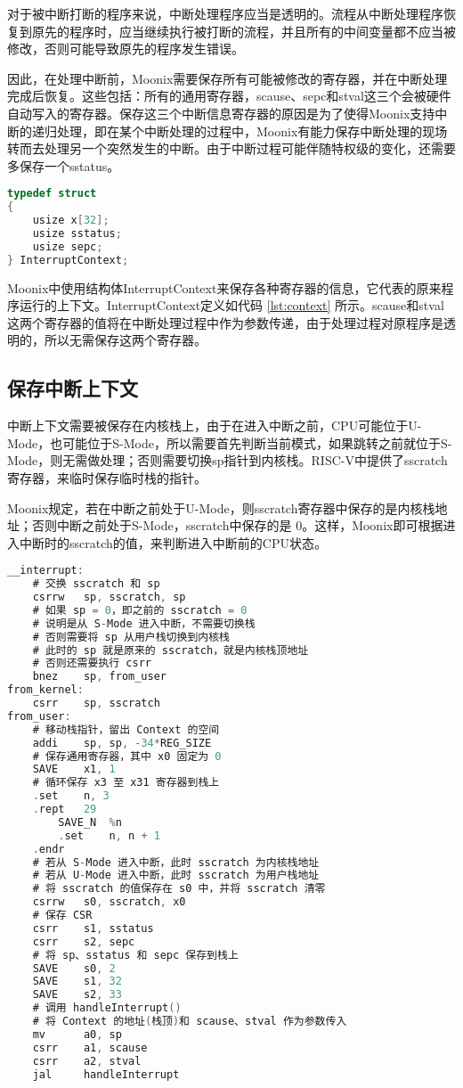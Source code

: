 对于被中断打断的程序来说，中断处理程序应当是透明的。流程从中断处理程序恢复到原先的程序时，应当继续执行被打断的流程，并且所有的中间变量都不应当被修改，否则可能导致原先的程序发生错误。

因此，在处理中断前，Moonix需要保存所有可能被修改的寄存器，并在中断处理完成后恢复。这些包括：所有的通用寄存器，scause、sepc和stval这三个会被硬件自动写入的寄存器。保存这三个中断信息寄存器的原因是为了使得Moonix支持中断的递归处理，即在某个中断处理的过程中，Moonix有能力保存中断处理的现场转而去处理另一个突然发生的中断。由于中断过程可能伴随特权级的变化，还需要多保存一个sstatus。

\begin{lstlisting}[language={C}, caption={上下文结构定义}, label={lst:context}]
typedef struct
{
	usize x[32];
	usize sstatus;
	usize sepc;
} InterruptContext;
\end{lstlisting}

Moonix中使用结构体InterruptContext来保存各种寄存器的信息，它代表的原来程序运行的上下文。InterruptContext定义如代码 \ref{lst:context} 所示。scause和stval这两个寄存器的值将在中断处理过程中作为参数传递，由于处理过程对原程序是透明的，所以无需保存这两个寄存器。

\subsection{保存中断上下文}

中断上下文需要被保存在内核栈上，由于在进入中断之前，CPU可能位于U-Mode，也可能位于S-Mode，所以需要首先判断当前模式，如果跳转之前就位于S-Mode，则无需做处理；否则需要切换sp指针到内核栈。RISC-V中提供了sscratch寄存器，来临时保存临时栈的指针。

Moonix规定，若在中断之前处于U-Mode，则sscratch寄存器中保存的是内核栈地址；否则中断之前处于S-Mode，sscratch中保存的是 0。这样，Moonix即可根据进入中断时的sscratch的值，来判断进入中断前的CPU状态。

\clearpage

\begin{lstlisting}[language={C}, caption={保存中断上下文}, label={lst:savecontext}]
__interrupt:
	# 交换 sscratch 和 sp
	csrrw   sp, sscratch, sp
	# 如果 sp = 0，即之前的 sscratch = 0
	# 说明是从 S-Mode 进入中断，不需要切换栈
	# 否则需要将 sp 从用户栈切换到内核栈
	# 此时的 sp 就是原来的 sscratch，就是内核栈顶地址
	# 否则还需要执行 csrr 
	bnez    sp, from_user
from_kernel:
	csrr    sp, sscratch
from_user:
	# 移动栈指针，留出 Context 的空间
	addi    sp, sp, -34*REG_SIZE
	# 保存通用寄存器，其中 x0 固定为 0
	SAVE    x1, 1
	# 循环保存 x3 至 x31 寄存器到栈上
	.set    n, 3
	.rept   29
		SAVE_N  %n
		.set    n, n + 1
	.endr
	# 若从 S-Mode 进入中断，此时 sscratch 为内核栈地址
	# 若从 U-Mode 进入中断，此时 sscratch 为用户栈地址
	# 将 sscratch 的值保存在 s0 中，并将 sscratch 清零
	csrrw   s0, sscratch, x0
	# 保存 CSR
	csrr    s1, sstatus
	csrr    s2, sepc
	# 将 sp、sstatus 和 sepc 保存到栈上 
	SAVE    s0, 2
	SAVE    s1, 32
	SAVE    s2, 33
	# 调用 handleInterrupt()
	# 将 Context 的地址(栈顶)和 scause、stval 作为参数传入
	mv      a0, sp
	csrr    a1, scause
	csrr    a2, stval
	jal     handleInterrupt
\end{lstlisting}

